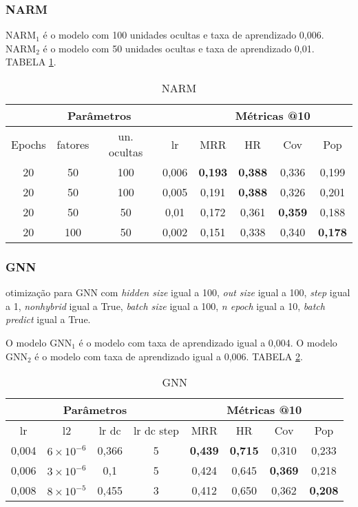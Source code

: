 \subsubsection{NARM}
$\text{NARM}_{1}$ é o modelo com 100 unidades ocultas e taxa de aprendizado 0,006.
$\text{NARM}_{2}$ é o modelo com 50 unidades ocultas e taxa de aprendizado 0,01.
TABELA \ref{app:narm_a1}.
\begin{table}
  \centering
  \begin{tabular}{|c|c|c|c|c|c|c|c|}
    \hline
      \multicolumn{4}{|c|}{Parâmetros} & \multicolumn{4}{c|}{Métricas @10} \\
      \hline
      Epochs & fatores & un. ocultas & lr & MRR & HR & Cov & Pop \\
      \hline
      20 & 50 & 100 & 0,006 & \textbf{0,193} & \textbf{0,388} & 0,336 & 0,199 \\
      \hline
      20 & 50 & 100 & 0,005 & 0,191 & \textbf{0,388} & 0,326 & 0,201 \\
      \hline
      20 & 50 & 50 & 0,01 & 0,172 & 0,361 & \textbf{0,359} & 0,188 \\
      \hline
      20 & 100 & 50 & 0,002 & 0,151 & 0,338 & 0,340 & \textbf{0,178} \\
      \hline
      \end{tabular}
      \caption{NARM}
      \label{app:narm_a1}
\end{table}

\subsubsection{GNN}
otimização para GNN com \textit{hidden size} igual a 100, \textit{out size} igual a 100,
\textit{step} igual a 1, \textit{nonhybrid} igual a True, \textit{batch size} igual a 100,
\textit{n epoch} igual a 10, \textit{batch predict} igual a True.

O modelo $\text{GNN}_{1}$ é o modelo com taxa de aprendizado igual a 0,004.
O modelo $\text{GNN}_{2}$ é o modelo com taxa de aprendizado igual a 0,006. TABELA \ref{app:gnn}.
\begin{table}
  \centering
  \begin{tabular}{|c|c|c|c|c|c|c|c|}
    \hline
      \multicolumn{4}{|c|}{Parâmetros} & \multicolumn{4}{c|}{Métricas @10} \\
      \hline
      lr & l2 & lr dc & lr dc step & MRR & HR & Cov & Pop \\
      \hline
      0,004 & $6 \times 10^{-6}$ & 0,366 & 5 & \textbf{0,439} & \textbf{0,715} & 0,310 & 0,233 \\
      \hline
      0,006 & $3 \times 10^{-6}$ & 0,1 & 5 & 0,424 & 0,645 & \textbf{0,369} & 0,218 \\
      \hline
      0,008 & $8 \times 10^{-5}$ & 0,455 & 3 & 0,412 & 0,650 & 0,362 & \textbf{0,208} \\
      \hline
      \end{tabular}
      \caption{GNN}
      \label{app:gnn}
\end{table}

